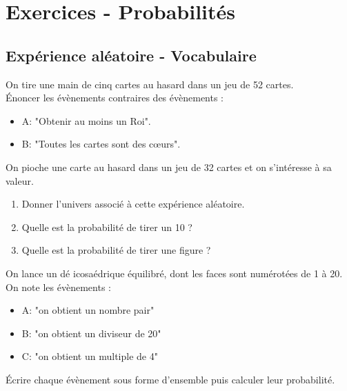 \bigskip

\newpage

\section*{Exercices - Probabilités}
{\setlength{\columnseprule}{0pt}
\setcounter{NumEx}{1}

\subsection*{Expérience aléatoire - Vocabulaire}

\begin{Exercice}
On tire une main de cinq cartes au hasard dans un jeu de 52 cartes.\\
Énoncer les évènements contraires des évènements :
\begin{itemize}[label=\textcolor{Couleur6}{$\bullet$}]
\item A:  "Obtenir au moins un Roi".
\item B:  "Toutes les cartes sont des cœurs".
\end{itemize}
\end{Exercice}

\begin{Exercice}
On pioche une carte au hasard dans un jeu de 32 cartes et on s'intéresse à sa valeur.
\begin{enumerate}
\item Donner l'univers associé à cette expérience aléatoire.
\item Quelle est la probabilité de tirer un 10 ?
\item Quelle est la probabilité de tirer une figure ?
\end{enumerate}
\end{Exercice}

\begin{Exercice}
On lance un dé icosaédrique équilibré, dont les faces sont numérotées de 1 à 20.
On note les évènements :
\begin{itemize}[label=\textcolor{Couleur6}{$\bullet$}]
\item A:  "on obtient un nombre pair"
\item B:  "on obtient un diviseur de 20"
\item C:  "on obtient un multiple de 4"
\end{itemize}
Écrire chaque évènement sous forme d'ensemble puis calculer leur probabilité.
\end{Exercice}

}
